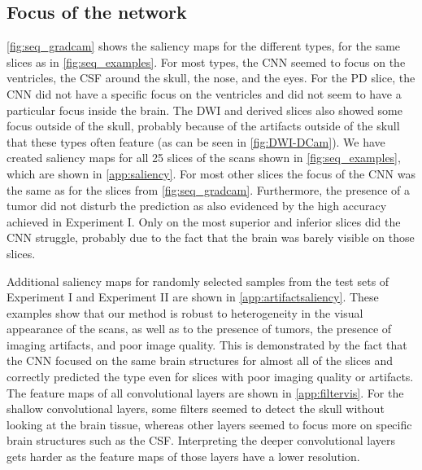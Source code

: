 \subsection{Focus of the network}
\cref{fig:seq_gradcam} shows the saliency maps for the different \glspl{type}, for the same \glspl{slice} as in \cref{fig:seq_examples}.
For most \glspl{type}, the \gls{CNN} seemed to focus on the ventricles, the \gls{CSF} around the skull, the nose, and the eyes.
For the \gls{PD} \gls{slice}, the \gls{CNN} did not have a specific focus on the ventricles and did not seem to have a particular focus inside the brain.
The \gls{DWI} and derived \glspl{slice} also showed some focus outside of the skull, probably because of the artifacts outside of the skull that these \glspl{type} often feature (as can be seen in \cref{fig:DWI-DCam}).
We have created saliency maps for all 25 \glspl{slice} of the \glspl{scan} shown in \cref{fig:seq_examples}, which are shown in \cref{app:saliency}.
For most other \glspl{slice} the focus of the \gls{CNN} was the same as for the \glspl{slice} from \cref{fig:seq_gradcam}.
Furthermore, the presence of a tumor did not disturb the prediction as also evidenced by the high accuracy achieved in Experiment I.
Only on the most superior and inferior \glspl{slice} did the \gls{CNN} struggle, probably due to the fact that the brain was barely visible on those \glspl{slice}.

Additional saliency maps for randomly selected \glspl{sample} from the test sets of Experiment I and Experiment II are shown in \cref{app:artifactsaliency}.
These examples show that our method is robust to heterogeneity in the visual appearance of the \glspl{scan}, as well as to the presence of tumors, the presence of imaging artifacts, and poor image quality.
This is demonstrated by the fact that the \gls{CNN} focused on the same brain structures for almost all of the \glspl{slice} and correctly predicted the \gls{type} even for \glspl{slice} with poor imaging quality or artifacts.
The feature maps of all convolutional layers are shown in \cref{app:filtervis}.
For the shallow convolutional layers, some filters seemed to detect the skull without looking at the brain tissue, whereas other layers seemed to focus more on specific brain structures such as the \gls{CSF}.
Interpreting the deeper convolutional layers gets harder as the feature maps of those layers have a lower resolution.

